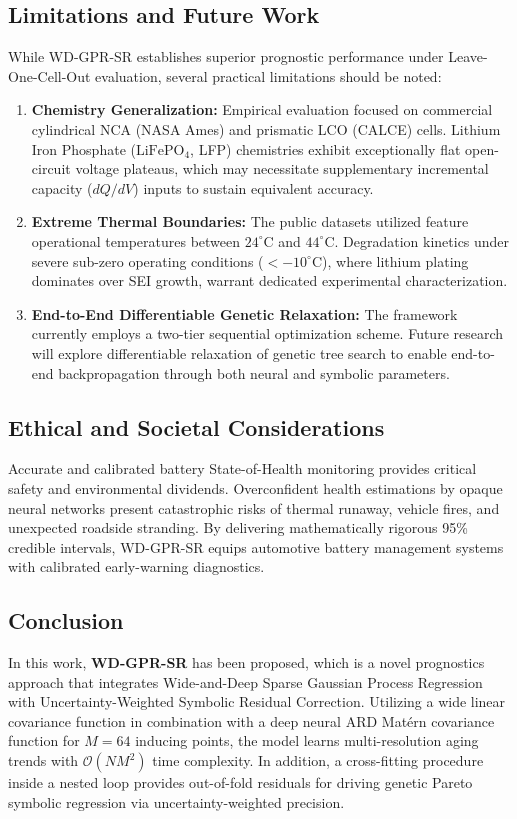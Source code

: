 \documentclass[a4paper,fleqn]{cas-sc}
\begin{document}
\subsection{Limitations and Future Work}
While WD-GPR-SR establishes superior prognostic performance under Leave-One-Cell-Out evaluation, several practical limitations should be noted:
\begin{enumerate}
    \item \textbf{Chemistry Generalization:} Empirical evaluation focused on commercial cylindrical NCA (NASA Ames) and prismatic LCO (CALCE) cells. Lithium Iron Phosphate ($\text{LiFePO}_4$, LFP) chemistries exhibit exceptionally flat open-circuit voltage plateaus, which may necessitate supplementary incremental capacity ($dQ/dV$) inputs to sustain equivalent accuracy.
    \item \textbf{Extreme Thermal Boundaries:} The public datasets utilized feature operational temperatures between $24^\circ$C and $44^\circ$C. Degradation kinetics under severe sub-zero operating conditions ($<-10^\circ$C), where lithium plating dominates over SEI growth, warrant dedicated experimental characterization.
    \item \textbf{End-to-End Differentiable Genetic Relaxation:} The framework currently employs a two-tier sequential optimization scheme. Future research will explore differentiable relaxation of genetic tree search to enable end-to-end backpropagation through both neural and symbolic parameters.
\end{enumerate}

\subsection{Ethical and Societal Considerations}
Accurate and calibrated battery State-of-Health monitoring provides critical safety and environmental dividends. Overconfident health estimations by opaque neural networks present catastrophic risks of thermal runaway, vehicle fires, and unexpected roadside stranding. By delivering mathematically rigorous 95\% credible intervals, WD-GPR-SR equips automotive battery management systems with calibrated early-warning diagnostics.

\subsection{Conclusion}
In this work, \textbf{WD-GPR-SR} has been proposed, which is a novel prognostics approach that integrates Wide-and-Deep Sparse Gaussian Process Regression with Uncertainty-Weighted Symbolic Residual Correction. Utilizing a wide linear covariance function in combination with a deep neural ARD Matérn covariance function for $M = 64$ inducing points, the model learns multi-resolution aging trends with $\mathcal{O}(NM^2)$ time complexity. In addition, a cross-fitting procedure inside a nested loop provides out-of-fold residuals for driving genetic Pareto symbolic regression via uncertainty-weighted precision.
\end{document}

